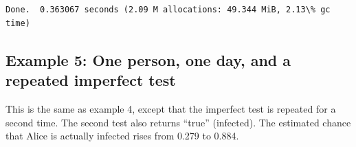 \documentclass[11pt]{article}
\begin{document}
    \begin{center}
    \end{center}
    { \hspace*{\fill} \\}
    
    \begin{Verbatim}[commandchars=\\\{\}]

Done.  0.363067 seconds (2.09 M allocations: 49.344 MiB, 2.13\% gc time)
    \end{Verbatim}
\newpage
    \hypertarget{example-5-one-person-one-day-and-a-repeated-imperfect-test}{%
\subsection{Example 5: One person, one day, and a repeated imperfect
test}\label{example-5-one-person-one-day-and-a-repeated-imperfect-test}}

This is the same as example 4, except that the imperfect test is
repeated for a second time. The second test also returns ``true''
(infected). The estimated chance that Alice is actually infected rises
from 0.279 to 0.884.
\end{document}

